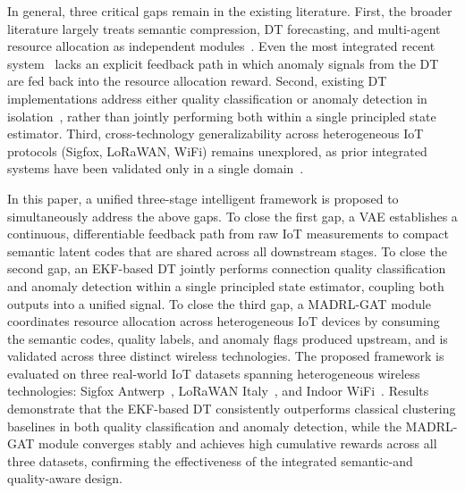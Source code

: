 \documentclass[conference]{IEEEtran}
\begin{document}
In general, three critical gaps remain in the existing literature. First,
the broader literature largely treats semantic compression, DT
forecasting, and multi-agent resource allocation as independent
modules~\cite{ref_vae_wireless,ref_dt_iot,ref_dt_resource}. Even the
most integrated recent system~\cite{ref_semadt} lacks an explicit feedback
path in which anomaly signals from the DT are fed back into
the resource allocation reward. Second, existing DT implementations
address either quality classification or anomaly detection in
isolation~\cite{ref_dt_resource,ref_anomaly_survey}, rather than jointly performing
both within a single principled state estimator. Third, cross-technology
generalizability across heterogeneous IoT protocols (Sigfox, LoRaWAN, WiFi)
remains unexplored, as prior integrated systems have been validated only
in a single domain~\cite{ref_semadt}.

In this paper, a unified three-stage intelligent framework is proposed to
simultaneously address the above gaps. To close the first gap, a
VAE establishes a continuous, differentiable
feedback path from raw IoT measurements to compact semantic latent codes
that are shared across all downstream stages. To close the second gap,
an EKF-based DT jointly performs
connection quality classification and anomaly detection within a single
principled state estimator, coupling both outputs into a unified signal.
To close the third gap, a MADRL-GAT module coordinates
resource allocation across heterogeneous IoT devices by consuming the
semantic codes, quality labels, and anomaly flags produced upstream,
and is validated across three distinct wireless technologies. The proposed framework is evaluated on three real-world IoT datasets
spanning heterogeneous wireless technologies: Sigfox
Antwerp~\cite{ref_sigfox}, LoRaWAN Italy~\cite{ref_lorawan}, and
Indoor WiFi~\cite{ref_indoor}. Results demonstrate that the EKF-based
DT consistently outperforms classical clustering baselines in
both quality classification and anomaly detection, while the MADRL-GAT
module converges stably and achieves high cumulative rewards across all
three datasets, confirming the effectiveness of the integrated
semantic-and quality-aware design.
\end{document}
